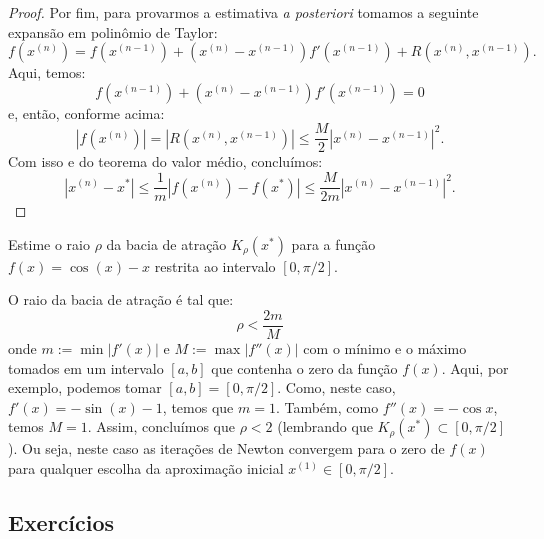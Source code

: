 \begin{proof}
Por fim, para provarmos a estimativa \emph{a posteriori} tomamos a seguinte expansão em polinômio de Taylor:
\begin{equation}
  f(x^{(n)}) = f(x^{(n-1)}) + (x^{(n)} - x^{(n-1)})f'(x^{(n-1)}) + R(x^{(n)},x^{(n-1)}).
\end{equation}
Aqui, temos:
\begin{equation}
  f(x^{(n-1)}) + (x^{(n)} - x^{(n-1)})f'(x^{(n-1)}) = 0
\end{equation}
e, então, conforme acima:
\begin{equation}
  |f(x^{(n)})| = |R(x^{(n)},x^{(n-1)})| \leq \frac{M}{2}|x^{(n)} - x^{(n-1)}|^2.
\end{equation}
Com isso e do teorema do valor médio, concluímos:
\begin{equation}
  |x^{(n)} - x^*| \leq \frac{1}{m}|f(x^{(n)}) - f(x^*)| \leq \frac{M}{2m}|x^{(n)} - x^{(n-1)}|^2.
\end{equation}
\end{proof}

\begin{ex}
  Estime o raio $\rho$ da bacia de atração $K_\rho(x^*)$ para a função $f(x) = \cos(x) - x$ restrita ao intervalo $[0, \pi/2]$.
\end{ex}
\begin{sol}
  O raio da bacia de atração é tal que:
  \begin{equation}
    \rho < \frac{2m}{M}
  \end{equation}
onde $m := \min |f'(x)|$ e $M := \max |f''(x)|$ com o mínimo e o máximo tomados em um intervalo $[a, b]$ que contenha o zero da função $f(x)$. Aqui, por exemplo, podemos tomar $[a, b] = [0, \pi/2]$. Como, neste caso, $f'(x) = -\sin(x) - 1$, temos que $m = 1$. Também, como $f''(x) = -\cos x$, temos $M = 1$. Assim, concluímos que $\rho < 2$ (lembrando que $K_\rho(x^*)\subset [0, \pi/2]$). Ou seja, neste caso as iterações de Newton convergem para o zero de $f(x)$ para qualquer escolha da aproximação inicial $x^{(1)}\in [0, \pi/2]$.
\end{sol}

\subsection*{Exercícios}

